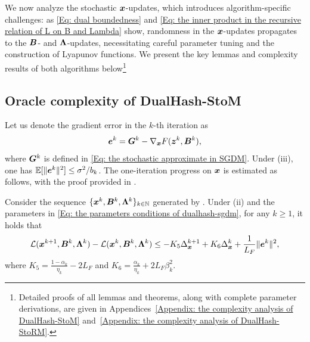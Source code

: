 We now analyze the stochastic $\bm{x}$-updates, which introduces algorithm-specific challenges:
as \eqref{Eq: dual boundedness} and \eqref{Eq: the inner product in the recursive relation of L on B and Lambda} show,
randomness in the $\bm{x}$-updates propagates to the $\bm{B}$- and $\bm{\Lambda}$-updates, necessitating careful parameter tuning and the construction of Lyapunov functions. We present the key lemmas and complexity results of both algorithms below\footnote{Detailed proofs of all lemmas and theorems, along with complete parameter derivations,
are given in Appendices~\ref{Appendix: the complexity analysis of DualHash-StoM} and~\ref{Appendix: the complexity analysis of DualHash-StoRM}.}
\subsection{Oracle complexity of DualHash-StoM}
Let us denote the gradient error in the $k$-th iteration as
\[
\bm{e}^{k} = \bm{G}^{k} - \nabla_{\bm{x}}F(\bm{z}^{k}, \bm{B}^{k}),
\]where $\bm{G}^k$ is defined in \eqref{Eq: the stochastic approximate in SGDM}. Under (iii), one has $\mathbb{E}[\|\bm{e}^k\|^2] \leq \sigma^2/b_k$. The one-iteration progress on $\bm{x}$ is estimated as follows, with the proof provided in .
\begin{lemma}
    \label{Lemma: One-iteration progress of x in SGDM}
    Consider the sequence $\{\bm{x}^k, \bm{B}^k, \bm{\Lambda}^k\}_{k \in \mathbb{N}}$ generated by . Under (ii) and the parameters in \eqref{Eq: the parameters conditions of dualhash-sgdm}, for any $k \geq 1$, it holds that
    \begin{align}
        \label{Eq: One-iteration progress of x in SGDM}
        \mathcal{L} (\bm{x}^{k+1}, \bm{B}^{k}, \bm{\Lambda}^{k}) - \mathcal{L} (\bm{x}^{k}, \bm{B}^{k}, \bm{\Lambda}^{k})
        \leq -K_5\Delta_{\bm{x}}^{k+1}+K_6\Delta_{\bm{x}}^{k}+ \frac{1}{L_{F}}\|\bm{e}^{k}\|^{2},
    \end{align}
    where \(K_5 = \frac{1 - \alpha_{k}}{\eta_{k}}- 2L_F\) and \(K_6 = \frac{\alpha_{k}}{\eta_{k}}+ 2L_F\beta_k^2\).
\end{lemma}

